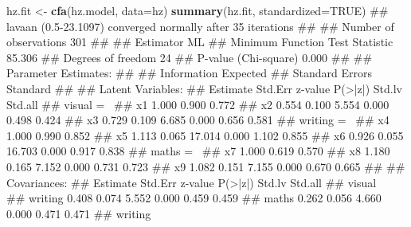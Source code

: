 \documentclass[]{article}
\newenvironment{Shaded}{\begin{snugshade}}{\end{snugshade}}
\newcommand{\KeywordTok}[1]{\textcolor[rgb]{0.13,0.29,0.53}{\textbf{#1}}}
\newcommand{\DataTypeTok}[1]{\textcolor[rgb]{0.13,0.29,0.53}{#1}}
\newcommand{\StringTok}[1]{\textcolor[rgb]{0.31,0.60,0.02}{#1}}
\newcommand{\OtherTok}[1]{\textcolor[rgb]{0.56,0.35,0.01}{#1}}
\newcommand{\NormalTok}[1]{#1}
\theoremstyle{definition}
\theoremstyle{definition}
\theoremstyle{definition}
\theoremstyle{remark}
\begin{document}
\begin{Shaded}
\begin{Highlighting}[]
\NormalTok{hz.fit <-}\StringTok{ }\KeywordTok{cfa}\NormalTok{(hz.model, }\DataTypeTok{data=}\NormalTok{hz)}
\KeywordTok{summary}\NormalTok{(hz.fit, }\DataTypeTok{standardized=}\OtherTok{TRUE}\NormalTok{)}
\NormalTok{## lavaan (0.5-23.1097) converged normally after  35 iterations}
\NormalTok{## }
\NormalTok{##   Number of observations                           301}
\NormalTok{## }
\NormalTok{##   Estimator                                         ML}
\NormalTok{##   Minimum Function Test Statistic               85.306}
\NormalTok{##   Degrees of freedom                                24}
\NormalTok{##   P-value (Chi-square)                           0.000}
\NormalTok{## }
\NormalTok{## Parameter Estimates:}
\NormalTok{## }
\NormalTok{##   Information                                 Expected}
\NormalTok{##   Standard Errors                             Standard}
\NormalTok{## }
\NormalTok{## Latent Variables:}
\NormalTok{##                    Estimate  Std.Err  z-value  P(>|z|)   Std.lv  Std.all}
\NormalTok{##   visual =~                                                             }
\NormalTok{##     x1                1.000                               0.900    0.772}
\NormalTok{##     x2                0.554    0.100    5.554    0.000    0.498    0.424}
\NormalTok{##     x3                0.729    0.109    6.685    0.000    0.656    0.581}
\NormalTok{##   writing =~                                                            }
\NormalTok{##     x4                1.000                               0.990    0.852}
\NormalTok{##     x5                1.113    0.065   17.014    0.000    1.102    0.855}
\NormalTok{##     x6                0.926    0.055   16.703    0.000    0.917    0.838}
\NormalTok{##   maths =~                                                              }
\NormalTok{##     x7                1.000                               0.619    0.570}
\NormalTok{##     x8                1.180    0.165    7.152    0.000    0.731    0.723}
\NormalTok{##     x9                1.082    0.151    7.155    0.000    0.670    0.665}
\NormalTok{## }
\NormalTok{## Covariances:}
\NormalTok{##                    Estimate  Std.Err  z-value  P(>|z|)   Std.lv  Std.all}
\NormalTok{##   visual ~~                                                             }
\NormalTok{##     writing           0.408    0.074    5.552    0.000    0.459    0.459}
\NormalTok{##     maths             0.262    0.056    4.660    0.000    0.471    0.471}
\NormalTok{##   writing ~~                                                            }

\end{Highlighting}
\end{Shaded}
\end{document}
